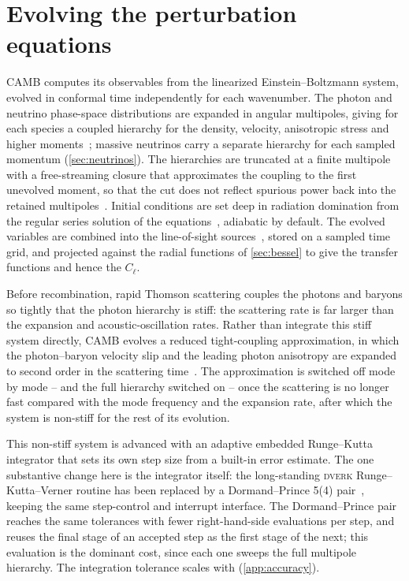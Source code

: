 \documentclass[prd, twocolumn, superscriptaddress, tightenlines, longbibliography, nofootinbib, eqsecnum, amsfonts, amsmath, floatfix, notitlepage]{revtex4-2}
\newcommand{\code}[1]{\texttt{\detokenize{#1}}}
\begin{document}
\section{Evolving the perturbation equations}
\label{sec:evolution}

\textsc{CAMB} computes its observables from the linearized
Einstein--Boltzmann system, evolved in conformal time independently for each
wavenumber. The photon and neutrino phase-space distributions are expanded in
angular multipoles, giving for each species a coupled hierarchy for the density,
velocity, anisotropic stress and higher
moments~\cite{Ma:1995ey,Hu:1998mn,Challinor:2000as}; massive neutrinos carry a
separate hierarchy for each sampled momentum (\cref{sec:neutrinos}). The
hierarchies are truncated at a finite multipole with a free-streaming closure
that approximates the coupling to the first unevolved moment, so that the cut
does not reflect spurious power back into the retained
multipoles~\cite{Ma:1995ey}. Initial conditions are set deep in radiation
domination from the regular series solution of the
equations~\cite{Bucher:1999re}, adiabatic by default. The evolved variables are
combined into the line-of-sight
sources~\cite{Seljak:1996is,Zaldarriaga:1997va,Challinor:2000as}, stored on a
sampled time grid, and projected against the radial functions of
\cref{sec:bessel} to give the transfer functions and hence the $C_\ell$.

Before recombination, rapid Thomson scattering couples the photons and baryons
so tightly that the photon hierarchy is stiff: the scattering rate is far larger
than the expansion and acoustic-oscillation rates. Rather than integrate this
stiff system directly, \textsc{CAMB} evolves a reduced tight-coupling
approximation, in which the photon--baryon velocity slip and the leading photon
anisotropy are expanded to second order in the scattering
time~\cite{CyrRacine:2010bk,Blas:2011rf}. The approximation is switched off mode
by mode -- and the full hierarchy switched on -- once the scattering is no longer
fast compared with the mode frequency and the expansion rate, after which the
system is non-stiff for the rest of its evolution.

This non-stiff system is advanced with an adaptive embedded Runge--Kutta
integrator that sets its own step size from a built-in error estimate. The one
substantive change here is the integrator itself: the long-standing
\textsc{dverk} Runge--Kutta--Verner routine has been replaced by a
Dormand--Prince 5(4) pair~\cite{DormandPrince:1980}, keeping the same
step-control and interrupt interface. The Dormand--Prince pair reaches the same tolerances with fewer
right-hand-side evaluations per step, and reuses the final stage of an accepted
step as the first stage of the next; this evaluation is the dominant cost, since
each one sweeps the full multipole hierarchy. The integration tolerance scales
with \code{IntTolBoost} (\cref{app:accuracy}).
\end{document}
